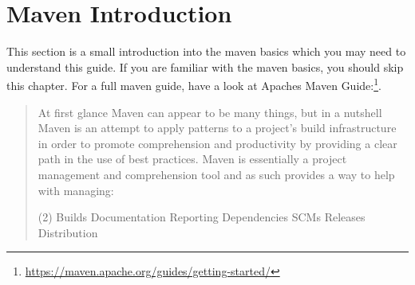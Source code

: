 \section{Maven Introduction}
This section is a small introduction into the maven basics which you may need to understand this guide. If you are familiar with the maven basics, you should skip this chapter. 
For a full maven guide, have a look at Apaches Maven Guide:\footnote{\label{footnote:maven}\url{https://maven.apache.org/guides/getting-started/}}. 

\begin{quotation}
At first glance Maven can appear to be many things, but in a nutshell Maven is an attempt to apply patterns to a project's build infrastructure in order to promote comprehension and productivity by providing a clear path in the use of best practices. Maven is essentially a project management and comprehension tool and as such provides a way to help with managing:
	\begin{tasks}(2)
		\task Builds
		\task Documentation
		\task Reporting
		\task Dependencies
		\task SCMs
		\task Releases
		\task Distribution
	\end{tasks}
\end{quotation}






